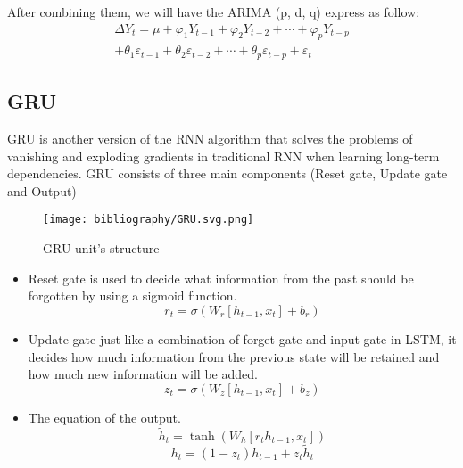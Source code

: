 \documentclass{ieeeojies}
\begin{document}
After combining them, we will have the ARIMA (p, d, q) express as follow:
\begin{align*}
\Delta Y_t = \mu + \varphi_1 Y_{t-1} + \varphi_2 Y_{t-2} + \cdots + \varphi_p Y_{t-p} \\
+ \theta_1 \varepsilon_{t-1} + \theta_2 \varepsilon_{t-2} + \cdots + \theta_p \varepsilon_{t-p} + \varepsilon_t
\end{align*}

\subsection{GRU}
GRU is another version of the RNN algorithm that solves the problems of vanishing and exploding gradients in traditional RNN when learning long-term dependencies. GRU consists of three main components (Reset gate, Update gate and Output) \cite{b9}
\begin{figure}[H]
    \centering
    \begin{minipage}{0.45\textwidth}
    \centering
    \texttt{[image: bibliography/GRU.svg.png]}    
    \label{fig:1}
    \caption{GRU unit's structure}
    \end{minipage}
\end{figure}
\begin{itemize}
    \item Reset gate is used to decide what information from the past should be forgotten by using a sigmoid function.\\
        \[r_t = \sigma(W_r [h_{t-1}, x_t] + b_r) \]
    
    \item Update gate just like a combination of forget gate and input gate in LSTM, it decides how much information from the previous state will be retained and how much new information will be added.\\
        \[ z_t = \sigma(W_z [h_{t-1}, x_t] + b_z) \]
    \item The equation of the output.\\
        \[ \tilde{h}_t = \tanh(W_h [r_t h_{t-1}, x_t]) \]
        \[ h_t = (1 - z_t) h_{t-1} + z_t \tilde{h}_t \]
\end{itemize}
\end{document}

